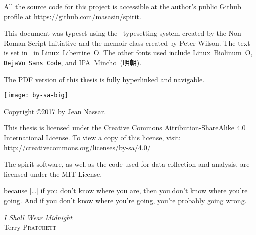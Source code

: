 \begin{titlingpage}
\maketitle
\thispagestyle{empty}

\clearpage
\null\vfill
\noindent \emph{\mytitle}

\noindent \emph{\mytitlejp}
\vspace{1em}

\noindent All the source code for this project is accessible at the author's public Github profile at \url{https://github.com/masasin/spirit}.
\vspace{1em}

\noindent This document was typeset using the \XeTeX\ typesetting system created by the Non-Roman Script Initiative and the \textsf{memoir} class created by Peter Wilson.
The text is set in \mytextsize\ in Linux~Libertine~O.
The other fonts used include \textsf{Linux~Biolinum~O}, \texttt{DejaVu~Sans~Code}, and IPA~Mincho~(明朝).
\vspace{1em}

\noindent The PDF version of this thesis is fully hyperlinked and navigable.
\vspace{1em}

\noindent \texttt{[image: by-sa-big]}

\noindent
Copyright \copyright 2017 by Jean Nassar.

\noindent This thesis is licensed under the Creative Commons Attribution-ShareAlike 4.0 International License.
To view a copy of this license, visit:\\
\url{http://creativecommons.org/licenses/by-sa/4.0/}

\noindent The \acrshort{spirit} software, as well as the code used for data collection and analysis, are licensed under the MIT License.

\end{titlingpage}


\thispagestyle{empty}
\setlength{\epigraphwidth}{0.7\textwidth}
\null\vfill
\epigraph{
  because [\ldots] if you don't know where you are, then you don't know where you're going.
  And if you don't know where you're going, you're probably going wrong.}
  {\emph{I Shall Wear Midnight}\\
   Terry \textsc{Pratchett}}
\vfill\vfill\null

